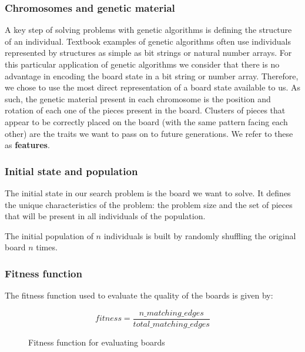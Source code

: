 \documentclass{llncs}
\begin{document}
\subsubsection{Chromosomes and genetic material}

A key step of solving problems with genetic algorithms is defining the structure of an individual. Textbook examples of genetic algorithms often use individuals represented by structures as simple as bit strings or natural number arrays. For this particular application of genetic algorithms we consider that there is no advantage in encoding the board state in a bit string or number array. Therefore, we chose to use the most direct representation of a board state available to us. As such, the genetic material present in each chromosome is the position and rotation of each one of the pieces present in the board. Clusters of pieces that appear to be correctly placed on the board (with the same pattern facing each other) are the traits we want to pass on to future generations. We refer to these as \textbf{features}.



\subsubsection{Initial state and population}

The initial state in our search problem is the board we want to solve. It defines the unique characteristics of the problem: the problem size and the set of pieces that will be present in all individuals of the population.

The initial population of $n$ individuals is built by randomly shuffling the original board $n$ times.

\subsubsection{Fitness function}\label{sec:fitness-function}

The fitness function used to evaluate the quality of the boards is given by:

\begin{figure}[H]
  \begin{equation}
    fitness = \frac{n\_matching\_edges}{total\_matching\_edges}
  \end{equation}
  \caption{Fitness function for evaluating boards}
  \label{fig:eq:fitness_function}
\end{figure}
\end{document}
